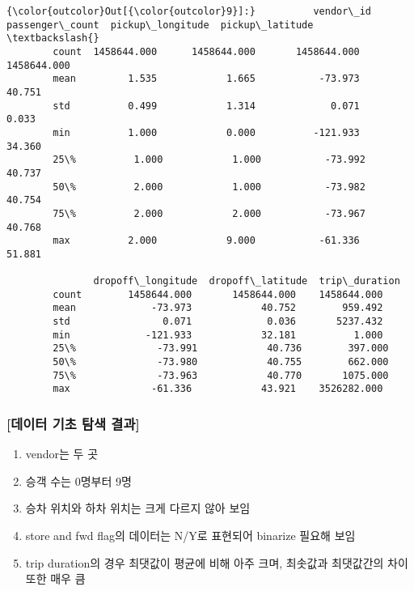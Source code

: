 \documentclass[11pt]{article}
\providecommand{\tightlist}{%
      \setlength{\itemsep}{0pt}\setlength{\parskip}{0pt}}
\begin{document}
\begin{Verbatim}[commandchars=\\\{\}]
{\color{outcolor}Out[{\color{outcolor}9}]:}          vendor\_id  passenger\_count  pickup\_longitude  pickup\_latitude  \textbackslash{}
        count  1458644.000      1458644.000       1458644.000      1458644.000   
        mean         1.535            1.665           -73.973           40.751   
        std          0.499            1.314             0.071            0.033   
        min          1.000            0.000          -121.933           34.360   
        25\%          1.000            1.000           -73.992           40.737   
        50\%          2.000            1.000           -73.982           40.754   
        75\%          2.000            2.000           -73.967           40.768   
        max          2.000            9.000           -61.336           51.881   
        
               dropoff\_longitude  dropoff\_latitude  trip\_duration  
        count        1458644.000       1458644.000    1458644.000  
        mean             -73.973            40.752        959.492  
        std                0.071             0.036       5237.432  
        min             -121.933            32.181          1.000  
        25\%              -73.991            40.736        397.000  
        50\%              -73.980            40.755        662.000  
        75\%              -73.963            40.770       1075.000  
        max              -61.336            43.921    3526282.000  
\end{Verbatim}
            
    \hypertarget{uxb370uxc774uxd130-uxae30uxcd08-uxd0d0uxc0c9-uxacb0uxacfc}{%
\subsubsection{{[}데이터 기초 탐색
결과{]}}\label{uxb370uxc774uxd130-uxae30uxcd08-uxd0d0uxc0c9-uxacb0uxacfc}}

\begin{enumerate}
\def\labelenumi{\arabic{enumi}.}
\tightlist
\item
  vendor는 두 곳
\item
  승객 수는 0명부터 9명
\item
  승차 위치와 하차 위치는 크게 다르지 않아 보임
\item
  store and fwd flag의 데이터는 N/Y로 표현되어 binarize 필요해 보임
\item
  trip duration의 경우 최댓값이 평균에 비해 아주 크며, 최솟값과
  최댓값간의 차이 또한 매우 큼
\end{enumerate}
\end{document}
